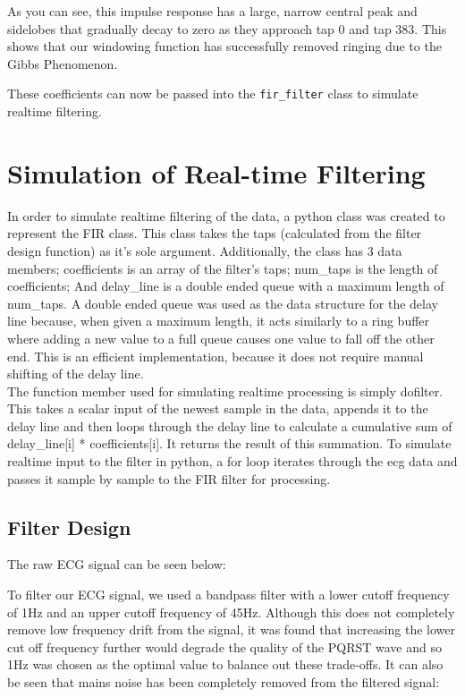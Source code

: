 \documentclass[8pt]{extarticle}
\begin{document}
As you can see, this impulse response has a large, narrow central peak and sidelobes that gradually decay to zero as they approach tap 0 and tap 383.
This shows that our windowing function has successfully removed ringing due to the Gibbs Phenomenon.


These coefficients can now be passed into the \texttt{fir\_filter} class to simulate realtime filtering.



\section{Simulation of Real-time Filtering}
In order to simulate realtime filtering of the data, a python class was created to represent the FIR class. This class takes the taps (calculated from the filter design function) as it's sole argument. Additionally, the class has 3 data members; coefficients is an array of the filter's taps; num{\_}taps is the length of coefficients; And delay{\_}line is a double ended queue with a maximum length of num{\_}taps. A double ended queue was used as the data structure for the delay line because, when given a maximum length, it acts similarly to a ring buffer where adding a new value to a full queue causes one value to fall off the other end. This is an efficient implementation, because it does not require manual shifting of the delay line.\\ The function member used for simulating realtime processing is simply dofilter. This takes a scalar input of the newest sample in the data, appends it to the delay line and then loops through the delay line to calculate a cumulative sum of delay{\_}line[i] * coefficients[i]. It returns the result of this summation. To simulate realtime input to the filter in python, a for loop iterates through the ecg data and passes it sample by sample to the FIR filter for processing.
\subsection{Filter Design}
The raw ECG signal can be seen below:




To filter our ECG signal, we used a bandpass filter with a lower cutoff frequency of 1Hz and an upper cutoff frequency of 45Hz. Although this
does not completely remove low frequency drift from the signal, it was found that increasing the lower cut off frequency further would
degrade the quality of the PQRST wave and so 1Hz was chosen as the optimal value to balance out these trade-offs. 
It can also be seen that mains noise has been completely removed from the filtered signal:
\end{document}
